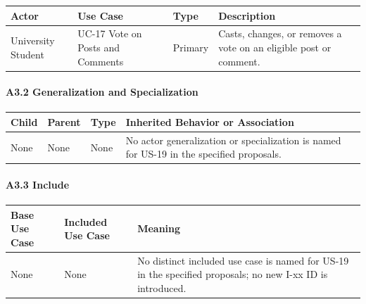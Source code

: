 \documentclass[12pt]{article}
\renewcommand{\baselinestretch}{1.5}
\begin{document}
\begingroup
\small
\renewcommand{\baselinestretch}{1.0}\selectfont
\renewcommand{\arraystretch}{1.15}
\setlength{\tabcolsep}{6pt}
\begin{longtable}{|>{\raggedright\arraybackslash}p{}|>{\raggedright\arraybackslash}p{}|>{\raggedright\arraybackslash}p{}|>{\raggedright\arraybackslash}p{}|}
\hline
\textbf{Actor} & \textbf{Use Case} & \textbf{Type} & \textbf{Description} \\ \hline
\endhead
University Student & UC-17 Vote on Posts and Comments & Primary & Casts, changes, or removes a vote on an eligible post or comment. \\ \hline
\end{longtable}
\endgroup
\par\medskip

\hypertarget{sec:a3-2-generalization-and-specialization}{}
\paragraph*{A3.2 Generalization and Specialization}
\par\medskip

\begingroup
\small
\renewcommand{\baselinestretch}{1.0}\selectfont
\renewcommand{\arraystretch}{1.15}
\setlength{\tabcolsep}{6pt}
\begin{longtable}{|>{\raggedright\arraybackslash}p{}|>{\raggedright\arraybackslash}p{}|>{\raggedright\arraybackslash}p{}|>{\raggedright\arraybackslash}p{}|}
\hline
\textbf{Child} & \textbf{Parent} & \textbf{Type} & \textbf{Inherited Behavior or Association} \\ \hline
\endhead
None & None & None & No actor generalization or specialization is named for US-19 in the specified proposals. \\ \hline
\end{longtable}
\endgroup
\par\medskip

\hypertarget{sec:a3-3-include}{}
\paragraph*{A3.3 Include}
\par\medskip

\begingroup
\small
\renewcommand{\baselinestretch}{1.0}\selectfont
\renewcommand{\arraystretch}{1.15}
\setlength{\tabcolsep}{6pt}
\begin{longtable}{|>{\raggedright\arraybackslash}p{}|>{\raggedright\arraybackslash}p{}|>{\raggedright\arraybackslash}p{}|}
\hline
\textbf{Base Use Case} & \textbf{Included Use Case} & \textbf{Meaning} \\ \hline
\endhead
None & None & No distinct included use case is named for US-19 in the specified proposals; no new I-xx ID is introduced. \\ \hline
\end{longtable}
\endgroup
\par\medskip
\end{document}
